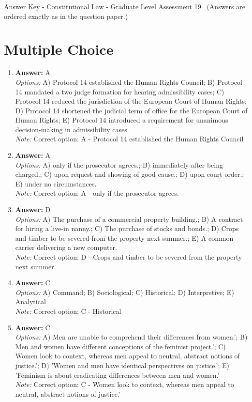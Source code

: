 \documentclass[12pt]{article}
\begin{document}
\begin{center}
Answer Key - Constitutional Law - Graduate Level Assessment 19 \
\small (Answers are ordered exactly as in the question paper.)
\end{center}

\section*{Multiple Choice}
\begin{enumerate}[label=\arabic*.]
\item \textbf{Answer:} A
\\ \textit{Options:} A) Protocol 14 established the Human Rights Council; B) Protocol 14 mandated a two judge formation for hearing admissibility cases; C) Protocol 14 reduced the jurisdiction of the European Court of Human Rights; D) Protocol 14 shortened the judicial term of office for the European Court of Human Rights; E) Protocol 14 introduced a requirement for unanimous decision-making in admissibility cases
\\ \textit{Note:} Correct option: A - Protocol 14 established the Human Rights Council
\item \textbf{Answer:} A
\\ \textit{Options:} A) only if the prosecutor agrees.; B) immediately after being charged.; C) upon request and showing of good cause.; D) upon court order.; E) under no circumstances.
\\ \textit{Note:} Correct option: A - only if the prosecutor agrees.
\item \textbf{Answer:} D
\\ \textit{Options:} A) The purchase of a commercial property building.; B) A contract for hiring a live-in nanny.; C) The purchase of stocks and bonds.; D) Crops and timber to be severed from the property next summer.; E) A common carrier delivering a new computer.
\\ \textit{Note:} Correct option: D - Crops and timber to be severed from the property next summer.
\item \textbf{Answer:} C
\\ \textit{Options:} A) Command; B) Sociological; C) Historical; D) Interpretive; E) Analytical
\\ \textit{Note:} Correct option: C - Historical
\item \textbf{Answer:} C
\\ \textit{Options:} A) Men are unable to comprehend their differences from women.'; B) Men and women have different conceptions of the feminist project.'; C) Women look to context, whereas men appeal to neutral, abstract notions of justice.'; D) 'Women and men have identical perspectives on justice.'; E) 'Feminism is about eradicating differences between men and women.'
\\ \textit{Note:} Correct option: C - Women look to context, whereas men appeal to neutral, abstract notions of justice.'
\end{enumerate}
\end{document}
